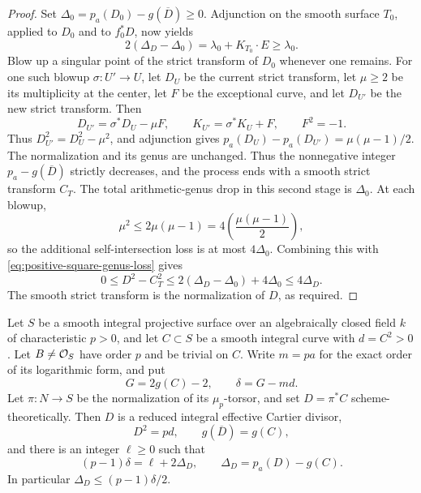 \begin{proof}
Set $\Delta_0=p_a(D_0)-g(\overline D)\geq0$.
Adjunction on the smooth surface $T_0$, applied to $D_0$ and to
$f_0^*D$, now yields
\begin{equation}\label{eq:positive-square-genus-loss}
 2(\Delta_D-\Delta_0)
    =\lambda_0+K_{T_0}\cdot E\geq\lambda_0.
\end{equation}
Blow up a singular point of the strict transform of $D_0$ whenever
one remains. For one such blowup $\sigma:U'\to U$, let $D_U$ be
the current strict transform, let $\mu\geq2$ be its multiplicity
at the center, let $F$ be the exceptional curve, and let $D_{U'}$
be the new strict transform. Then
\[
 D_{U'}=\sigma^*D_U-\mu F,\qquad
 K_{U'}=\sigma^*K_U+F,\qquad F^2=-1.
\]
Thus $D_{U'}^2=D_U^2-\mu^2$, and adjunction gives
$p_a(D_U)-p_a(D_{U'})=\mu(\mu-1)/2$.
The normalization and its genus are unchanged.
Thus the nonnegative integer $p_a-g(\overline D)$ strictly decreases,
and the process ends with a smooth strict transform $C_T$.
The total arithmetic-genus drop in this second stage is $\Delta_0$.
At each blowup,
\[
 \mu^2\leq2\mu(\mu-1)
       =4\left(\frac{\mu(\mu-1)}2\right),
\]
so the additional self-intersection loss is at most $4\Delta_0$.
Combining this with \eqref{eq:positive-square-genus-loss} gives
\[
 0\leq D^2-C_T^2
 \leq2(\Delta_D-\Delta_0)+4\Delta_0
 \leq4\Delta_D.
\]
The smooth strict transform is the normalization of $D$, as required.
\end{proof}

\begin{lemma}
\label{lem:positive-square-root-genus}
Let $S$ be a smooth integral projective surface over an algebraically
closed field $k$ of characteristic $p>0$, and let $C\subset S$ be a
smooth integral curve with $d=C^2>0$. Let $B\ne\mathcal O_S$ have order $p$
and be trivial on $C$. Write $m=pa$ for the exact order of its
logarithmic form, and put
\[
 G=2g(C)-2,\qquad \delta=G-md.
\]
Let $\pi:N\to S$ be the normalization of its $\mu_p$-torsor,
and set $D=\pi^*C$ scheme-theoretically. Then $D$ is a reduced
integral effective Cartier divisor,
\[
 D^2=pd,\qquad g(\overline D)=g(C),
\]
and there is an integer $\ell\geq0$ such that
\begin{equation}\label{eq:positive-square-conductor-genus}
 (p-1)\delta=\ell+2\Delta_D,\qquad
 \Delta_D=p_a(D)-g(C).
\end{equation}
In particular $\Delta_D\leq(p-1)\delta/2$.
\end{lemma}

